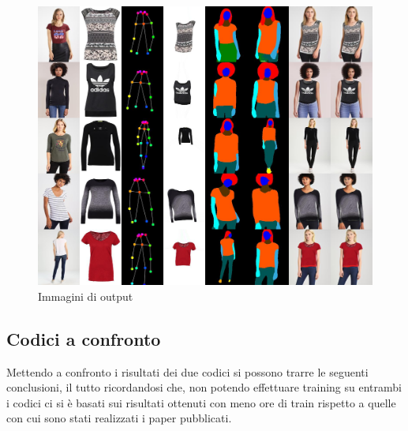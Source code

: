 \documentclass[final, 11pt]{article}
\begin{document}
	\begin{figure}[!htb]
		\centering
		\includegraphics[width=\linewidth]{Detailcarvingresult.jpg}
		\caption{Immagini di output}
	\end{figure} 
	
	\subsection{Codici a confronto}
	Mettendo a confronto i risultati dei due codici si possono trarre le seguenti conclusioni, il  tutto ricordandosi che, non potendo effettuare training su entrambi i codici ci si è basati sui risultati ottenuti con meno ore di train rispetto a quelle con cui sono stati realizzati i paper pubblicati.
	
\end{document}
